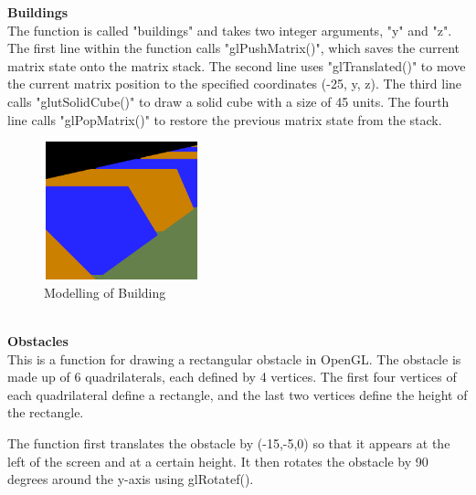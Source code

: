 \documentclass[12pt,a4]{article}
\begin{document}
{ \textbf{\Large{Buildings}}\\
 The function is called "buildings" and takes two integer arguments, "y" and "z".
The first line within the function calls "glPushMatrix()", which saves the current matrix state onto the matrix stack.
The second line uses "glTranslated()" to move the current matrix position to the specified coordinates (-25, y, z).
The third line calls "glutSolidCube()" to draw a solid cube with a size of 45 units.
The fourth line calls "glPopMatrix()" to restore the previous matrix state from the stack.\\
\begin{figure}[h]
    \centering
    \includegraphics[width=0.4\textwidth,height=4cm]{building.png}
    \caption{Modelling of Building}
\end{figure}
\\ 

\textbf{\Large{Obstacles}}\\
This is a function for drawing a rectangular obstacle in OpenGL. The obstacle is made up of 6 quadrilaterals, each defined by 4 vertices. The first four vertices of each quadrilateral define a rectangle, and the last two vertices define the height of the rectangle.

The function first translates the obstacle by (-15,-5,0) so that it appears at the left of the screen and at a certain height. It then rotates the obstacle by 90 degrees around the y-axis using glRotatef().

}
\end{document}
